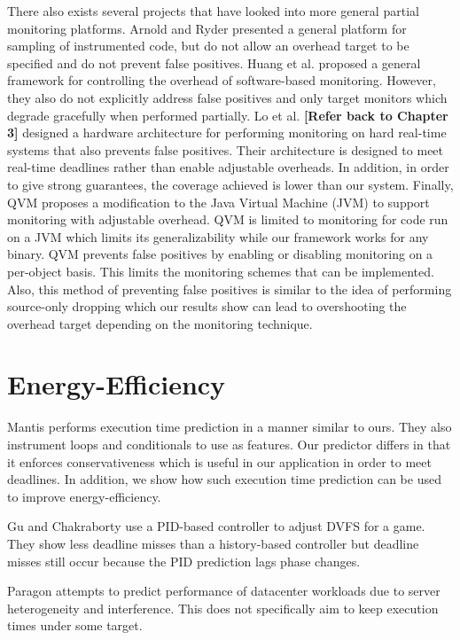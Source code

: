 There also exists several projects that have looked into more general partial
monitoring platforms. Arnold and Ryder \cite{arnold-pldi01} presented a general
platform for sampling of instrumented code, but do not allow an overhead target
to be specified and do not prevent false positives. Huang et al.
\cite{huang-sttt12} proposed a general framework for controlling the overhead
of software-based monitoring. However, they also do not explicitly address
false positives and only target monitors which degrade gracefully when
performed partially. Lo et al. \cite{lo-rtas14} \textbf{[Refer back to Chapter 3]} designed a hardware
architecture for performing monitoring on hard real-time systems that also
prevents false positives. Their architecture is designed to meet real-time
deadlines rather than enable adjustable overheads. In addition, in order to give strong
guarantees, the coverage achieved is lower than our system. Finally, QVM
\cite{qvm-oopsla08} proposes a modification to the Java Virtual Machine (JVM) to
support monitoring with adjustable overhead. 
QVM is limited to monitoring for code run on a JVM which limits its
generalizability while our framework works for any binary. QVM prevents false
positives by enabling or disabling monitoring on a per-object basis. This
limits the monitoring schemes that can be implemented. Also, this method of
preventing false positives is similar to the idea of performing source-only
dropping which our results show can lead to overshooting the overhead target
depending on the monitoring technique. 

\section{Energy-Efficiency}
\label{sec:related_work.energy}

Mantis \cite{mantis-atc13} performs execution time prediction in a manner
similar to ours. They also instrument loops and conditionals to use as
features. Our predictor differs in that it enforces conservativeness which is
useful in our application in order to meet deadlines. In addition, we show how
such execution time prediction can be used to improve energy-efficiency.

Gu and Chakraborty \cite{gu-dac08} use a PID-based controller to adjust DVFS
for a game. They show less deadline misses than a history-based controller but
deadline misses still occur because the PID prediction lags phase changes.

Paragon \cite{paragon-asplos13} attempts to predict performance of datacenter
workloads due to server heterogeneity and interference. This does not
specifically aim to keep execution times under some target.


